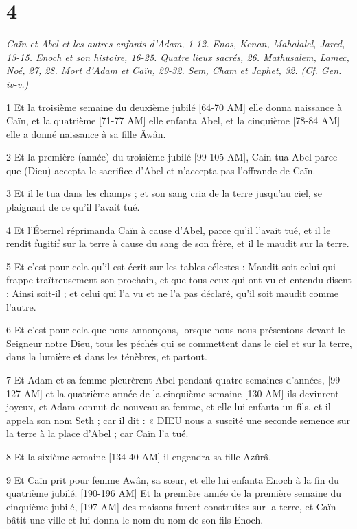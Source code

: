 \chapter{4}

\par \textit{Caïn et Abel et les autres enfants d'Adam, 1-12. Enos, Kenan, Mahalalel, Jared, 13-15. Enoch et son histoire, 16-25. Quatre lieux sacrés, 26. Mathusalem, Lamec, Noé, 27, 28. Mort d'Adam et Caïn, 29-32. Sem, Cham et Japhet, 32. (Cf. Gen. iv-v.)}

\par 1 Et la troisième semaine du deuxième jubilé [64-70 AM] elle donna naissance à Caïn, et la quatrième [71-77 AM] elle enfanta Abel, et la cinquième [78-84 AM] elle a donné naissance à sa fille Âwân.
\par 2 Et la première (année) du troisième jubilé [99-105 AM], Caïn tua Abel parce que (Dieu) accepta le sacrifice d'Abel et n'accepta pas l'offrande de Caïn.
\par 3 Et il le tua dans les champs ; et son sang cria de la terre jusqu'au ciel, se plaignant de ce qu'il l'avait tué.
\par 4 Et l'Éternel réprimanda Caïn à cause d'Abel, parce qu'il l'avait tué, et il le rendit fugitif sur la terre à cause du sang de son frère, et il le maudit sur la terre.
\par 5 Et c'est pour cela qu'il est écrit sur les tables célestes : Maudit soit celui qui frappe traîtreusement son prochain, et que tous ceux qui ont vu et entendu disent : Ainsi soit-il ; et celui qui l'a vu et ne l'a pas déclaré, qu'il soit maudit comme l'autre.
\par 6 Et c'est pour cela que nous annonçons, lorsque nous nous présentons devant le Seigneur notre Dieu, tous les péchés qui se commettent dans le ciel et sur la terre, dans la lumière et dans les ténèbres, et partout.
\par 7 Et Adam et sa femme pleurèrent Abel pendant quatre semaines d'années, [99-127 AM] et la quatrième année de la cinquième semaine [130 AM] ils devinrent joyeux, et Adam connut de nouveau sa femme, et elle lui enfanta un fils, et il appela son nom Seth ; car il dit : « DIEU nous a suscité une seconde semence sur la terre à la place d'Abel ; car Caïn l'a tué.
\par 8 Et la sixième semaine [134-40 AM] il engendra sa fille Azûrâ.
\par 9 Et Caïn prit pour femme Awân, sa sœur, et elle lui enfanta Enoch à la fin du quatrième jubilé. [190-196 AM] Et la première année de la première semaine du cinquième jubilé, [197 AM] des maisons furent construites sur la terre, et Caïn bâtit une ville et lui donna le nom du nom de son fils Enoch.

